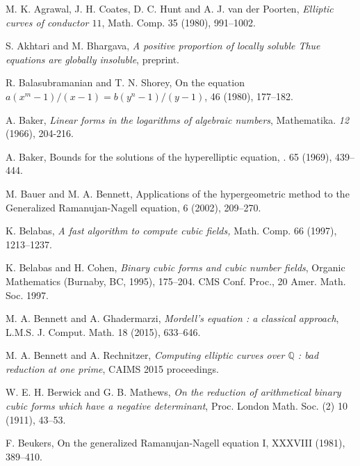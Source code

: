 

\begin{thebibliography}{}

M. K. Agrawal, J. H. Coates, D. C. Hunt and A. J. van der Poorten,
\emph{Elliptic curves of conductor $11$},
Math. Comp. 35 (1980), 991--1002.

S. Akhtari and M. Bhargava,
\emph{A positive proportion of locally soluble Thue equations are globally insoluble}, preprint.

R. Balasubramanian and T. N. Shorey,
\newblock On the equation $a(x^m-1)/(x-1) = b (y^n-1)/(y-1)$,
  46 (1980), 177--182.

A. Baker, 
\emph{Linear forms in the logarithms of algebraic numbers}, 
Mathematika. \textit{12} (1966), 204-216.

A. Baker,
\newblock Bounds for the solutions of the hyperelliptic equation, 
. 65 (1969), 439--444. 

M. Bauer and M. A. Bennett,
\newblock Applications of the hypergeometric method to the Generalized Ramanujan-Nagell equation,
 6 (2002), 209--270.

K. Belabas,
\emph{A fast algorithm to compute cubic fields,} Math. Comp. 66 (1997), 1213--1237.

K. Belabas and H. Cohen,
\emph{Binary cubic forms and cubic number fields},
Organic Mathematics (Burnaby, BC, 1995), 175--204. CMS Conf. Proc., 20 Amer. Math. Soc. 1997.

M. A. Bennett and A. Ghadermarzi,
\emph{Mordell's equation : a classical approach},
L.M.S. J. Comput. Math. 18 (2015), 633--646.

M. A. Bennett and A. Rechnitzer,
\emph{Computing elliptic curves over $\mathbb{Q}$ : bad reduction at one prime}, 
CAIMS 2015 proceedings.

W. E. H. Berwick and G. B. Mathews,
\emph{On the reduction of arithmetical binary cubic forms which have a negative determinant},
Proc. London Math. Soc. (2) 10 (1911), 43--53.

F. Beukers,
\newblock On the generalized Ramanujan-Nagell equation I,
 XXXVIII (1981), 389--410.


\end{thebibliography}
